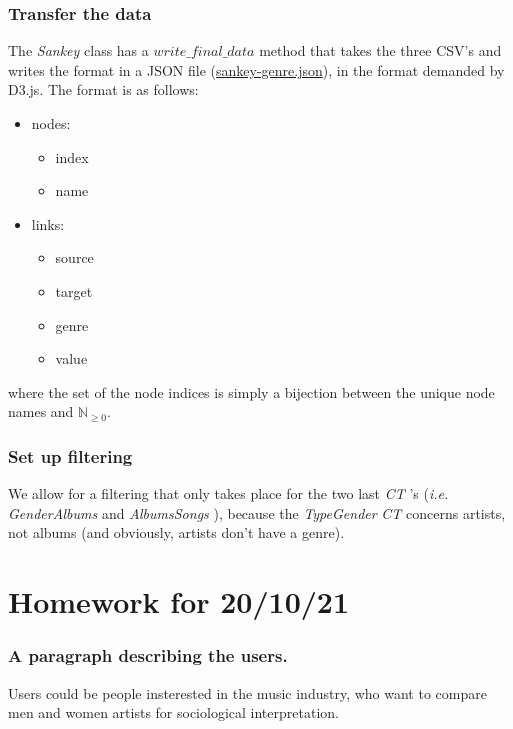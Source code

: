 \documentclass{article}
\newcommand{\N}{\mathbb{N}}
\newcommand{\ie}{\textit{i.e. }}
\newcommand{\tg}{\textit{TypeGender }}
\newcommand{\ga}{\textit{GenderAlbums }}
\newcommand{\as}{\textit{AlbumsSongs }}
\newcommand{\sk}{\textit{Sankey }}
\newcommand{\ct}{\textit{CT }}
\begin{document}
\subsubsection{Transfer the data}
The \sk class has a \(write\_final\_data\) method that takes the three CSV's and writes the format in a JSON file (\href{https://github.com/jorislimonier/collab-viz/blob/main/joris/sankey-genre.json}{sankey-genre.json}), in the format demanded by D3.js. The format is as follows:
\begin{itemize}
    \item nodes:
          \begin{itemize}
              \item index
              \item name
          \end{itemize}
    \item links:
          \begin{itemize}
              \item source
              \item target
              \item genre
              \item value
          \end{itemize}
\end{itemize}
where the set of the node indices is simply a bijection between the unique node names and \(\N_{\geq 0}\).

\subsubsection{Set up filtering}
We allow for a filtering that only takes place for the two last \ct's (\ie \ga and \as), because the \tg \ct concerns artists, not albums (and obviously, artists don't have a genre).

\newpage


\newpage


\section{Homework for 20/10/21}

\subsubsection*{A paragraph describing the users.}
Users could be people insterested in the music industry, who want to compare men and women artists for sociological interpretation.
\end{document}
